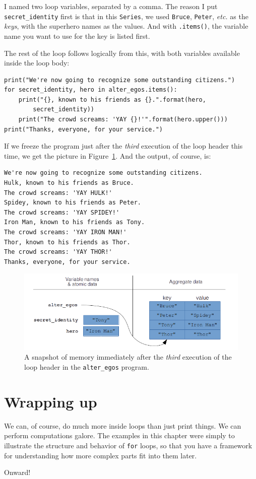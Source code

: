 I named two loop variables, separated by a comma. The reason I put
\texttt{secret\_identity} first is that in this \texttt{Series}, we used
\texttt{Bruce}, \texttt{Peter}, \textit{etc.} as the \textit{keys}, with the
superhero names as the values. And with \texttt{.items()}, the variable name
you want to use for the key is listed first.

The rest of the loop follows logically from this, with both variables available
inside the loop body:

\begin{Verbatim}[fontsize=\footnotesize,samepage=true,frame=single,framesep=3mm]
print("We're now going to recognize some outstanding citizens.")
for secret_identity, hero in alter_egos.items():
    print("{}, known to his friends as {}.".format(hero,
        secret_identity))
    print("The crowd screams: 'YAY {}!'".format(hero.upper()))
print("Thanks, everyone, for your service.")
\end{Verbatim}

If we freeze the program just after the \textit{third} execution of the loop
header this time, we get the picture in Figure~\ref{fig:loopsMemory2}. And the
output, of course, is:

\begin{Verbatim}[fontsize=\small,samepage=true,frame=leftline,framesep=5mm,framerule=1mm]
We're now going to recognize some outstanding citizens.
Hulk, known to his friends as Bruce.
The crowd screams: 'YAY HULK!'
Spidey, known to his friends as Peter.
The crowd screams: 'YAY SPIDEY!'
Iron Man, known to his friends as Tony.
The crowd screams: 'YAY IRON MAN!'
Thor, known to his friends as Thor.
The crowd screams: 'YAY THOR!'
Thanks, everyone, for your service.
\end{Verbatim}

\begin{figure}[ht]
\centering
\includegraphics[width=1\textwidth]{loopsMemory2.png}
\caption{A snapshot of memory immediately after the \textit{third} execution
of the loop header in the \texttt{alter\_egos} program.}
\label{fig:loopsMemory2}
\end{figure}

\pagebreak

\section{Wrapping up}

We can, of course, do much more inside loops than just print things. We can
perform computations galore. The examples in this chapter were simply to
illustrate the structure and behavior of \texttt{for} loops, so that you have a
framework for understanding how more complex parts fit into them later.

Onward!
